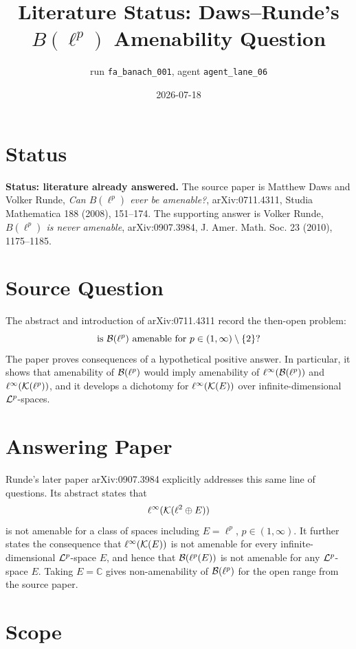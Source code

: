 \documentclass[11pt]{article}
\title{Literature Status: Daws--Runde's \(B(\ell^p)\) Amenability Question}
\author{run \texttt{fa\_banach\_001}, agent \texttt{agent\_lane\_06}}
\date{2026-07-18}
\begin{document}
\maketitle

\section*{Status}

\textbf{Status: literature already answered.} The source paper is Matthew
Daws and Volker Runde, \emph{Can \(B(\ell^p)\) ever be amenable?},
arXiv:0711.4311, Studia Mathematica 188 (2008), 151--174. The supporting
answer is Volker Runde, \emph{\(B(\ell^p)\) is never amenable},
arXiv:0907.3984, J. Amer. Math. Soc. 23 (2010), 1175--1185.

\section*{Source Question}

The abstract and introduction of arXiv:0711.4311 record the then-open problem:
\[
  \text{is } {\cal B}(\ell^p) \text{ amenable for }
  p\in (1,\infty)\setminus\{2\}?
\]
The paper proves consequences of a hypothetical positive answer. In particular,
it shows that amenability of \({\cal B}(\ell^p)\) would imply amenability of
\(\ell^\infty({\cal B}(\ell^p))\) and \(\ell^\infty({\cal K}(\ell^p))\), and
it develops a dichotomy for \(\ell^\infty({\cal K}(E))\) over
infinite-dimensional \({\cal L}^p\)-spaces.

\section*{Answering Paper}

Runde's later paper arXiv:0907.3984 explicitly addresses this same line of
questions. Its abstract states that
\[
  \ell^\infty({\cal K}(\ell^2\oplus E))
\]
is not amenable for a class of spaces including \(E=\ell^p\),
\(p\in(1,\infty)\). It further states the consequence that
\(\ell^\infty({\cal K}(E))\) is not amenable for every infinite-dimensional
\({\cal L}^p\)-space \(E\), and hence that \({\cal B}(\ell^p(E))\) is not
amenable for any \({\cal L}^p\)-space \(E\). Taking \(E=\mathbb C\) gives
non-amenability of \({\cal B}(\ell^p)\) for the open range from the source
paper.

\section*{Scope}
\end{document}
